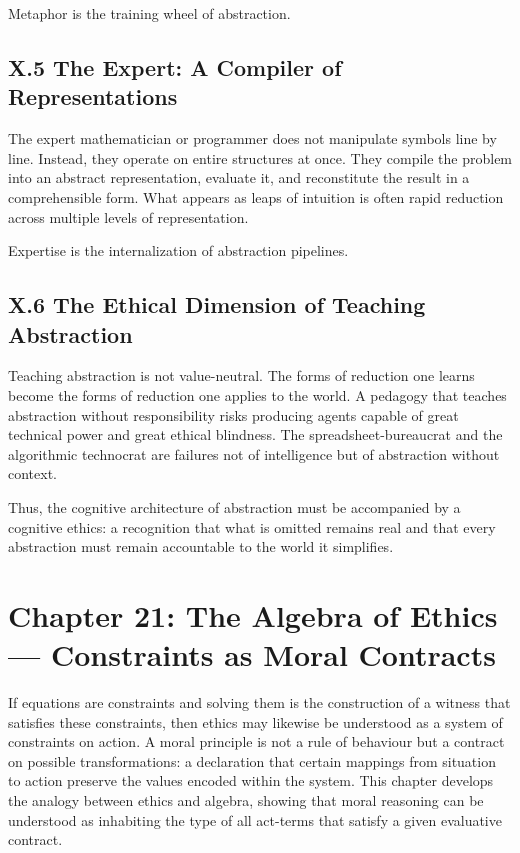 \documentclass[12pt,letterpaper]{article}
\theoremstyle{remark}
\begin{document}
Metaphor is the training wheel of abstraction.

\subsection{X.5 The Expert: A Compiler of Representations}

The expert mathematician or programmer does not manipulate symbols line by line. Instead, they operate on entire structures at once. They compile the problem into an abstract representation, evaluate it, and reconstitute the result in a comprehensible form. What appears as leaps of intuition is often rapid reduction across multiple levels of representation.

Expertise is the internalization of abstraction pipelines.

\subsection{X.6 The Ethical Dimension of Teaching Abstraction}

Teaching abstraction is not value-neutral. The forms of reduction one learns become the forms of reduction one applies to the world. A pedagogy that teaches abstraction without responsibility risks producing agents capable of great technical power and great ethical blindness. The spreadsheet-bureaucrat and the algorithmic technocrat are failures not of intelligence but of abstraction without context.

Thus, the cognitive architecture of abstraction must be accompanied by a cognitive ethics: a recognition that what is omitted remains real and that every abstraction must remain accountable to the world it simplifies.

\newpage
\section{Chapter 21: The Algebra of Ethics — Constraints as Moral Contracts}

If equations are constraints and solving them is the construction of a witness that satisfies these constraints, then ethics may likewise be understood as a system of constraints on action. A moral principle is not a rule of behaviour but a contract on possible transformations: a declaration that certain mappings from situation to action preserve the values encoded within the system. This chapter develops the analogy between ethics and algebra, showing that moral reasoning can be understood as inhabiting the type of all act-terms that satisfy a given evaluative contract.
\end{document}
